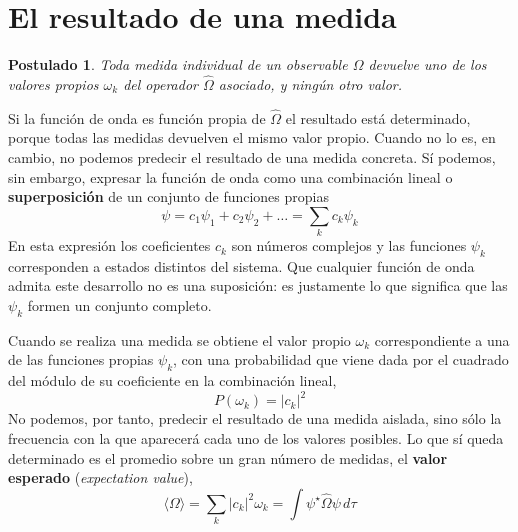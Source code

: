 \documentclass{tufte-handout}
\newtheorem{theorem}{Postulado}
\begin{document}
\section{El resultado de una medida}
\begin{theorem}
Toda medida individual de un observable $\Omega$ devuelve
uno de los valores propios $\omega_k$ del operador
$\hat{\Omega}$ asociado, y ningún otro valor.
\end{theorem}
Si la función de onda es función propia de $\hat{\Omega}$
el resultado está determinado, porque todas las medidas
devuelven el mismo valor propio. Cuando no lo es, en
cambio, no podemos predecir el resultado de una medida
concreta. Sí podemos, sin embargo, expresar la
función de onda como una combinación lineal o
\textbf{superposición} de un conjunto de funciones
propias
\begin{equation}
\psi =  c_1\psi_1 + c_2\psi_2 + \dots = \sum_kc_k\psi_k
\label{eq:superposicion}
\end{equation}
En esta expresión los coeficientes $c_k$ son números
complejos y las funciones $\psi_k$ corresponden a estados
distintos del sistema. Que cualquier función de onda admita
este desarrollo no es una suposición: es justamente lo que
significa que las $\psi_k$ formen un conjunto completo.

Cuando se realiza una medida se obtiene el valor propio
$\omega_k$ correspondiente a una de las funciones propias
$\psi_k$, con una probabilidad que viene dada por el
cuadrado del módulo de su coeficiente en la combinación
lineal,
\begin{equation}
    P(\omega_k)=|c_k|^2
    \label{eq:prob-ck}
\end{equation}
No podemos, por tanto, predecir el resultado de una medida
aislada, sino sólo la frecuencia con la que aparecerá cada
uno de los valores posibles. Lo que sí queda determinado es
el promedio sobre un gran número de medidas, el
\textbf{valor esperado} (\textit{expectation value}),
\begin{equation}
    \langle\Omega\rangle=\sum_k|c_k|^2\omega_k=
    \int\psi^\star\hat{\Omega}\psi\,d\tau
    \label{eq:valor-esperado}
\end{equation}
\end{document}
